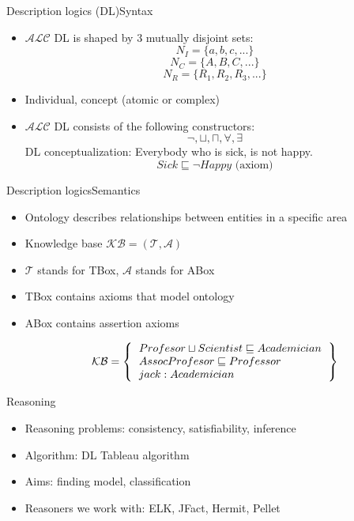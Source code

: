 \documentclass{beamer}
\begin{document}
\begin{frame}{Description logics (DL)}{Syntax}
	\begin{itemize}
	\item {
		$\mathcal{ALC}$ DL is shaped by 3 mutually disjoint sets:
		\[ N_{I} = \{ a,b,c, ... \} \]
		\[ N_{C} = \{ A,B,C, ... \} \]
		\[N_{R} = \{ R_{1}, R_{2}, R_{3}, ... \} \]
	}
	
	\item {
		Individual, concept (atomic or complex)
	}		
	
	\item {
		$\mathcal{ALC}$ DL consists of the following constructors:
		\[ \neg, \sqcup, \sqcap, \forall, \exists \]
		DL conceptualization: Everybody who is sick, is not happy.
		\[ Sick \sqsubseteq \neg Happy \text{ (axiom)} \]
	}
	\end{itemize}
\end{frame}

\begin{frame}{Description logics}{Semantics}
	\begin{itemize}
				
		\item {
			Ontology describes relationships between entities in a specific area
		}
		
		\item {
			Knowledge base $\mathcal{KB} = (\mathcal{T}, \mathcal{A})$	
		}
		
		\item {
			$\mathcal{T}$ stands for TBox, $\mathcal{A}$ stands for ABox
		}
		
		\item {
			TBox contains axioms that model ontology
		}
		
		\item {
			ABox contains assertion axioms
		}
		
		\[ 
		\mathcal{KB} = \left\{
		\begin{tabular}{l c}
		$Profesor \sqcup Scientist \sqsubseteq Academician$ \\
		$AssocProfesor \sqsubseteq Professor$ \\
		$jack: Academician$ \\
		\end{tabular}
		\right \}
		\]

	\end{itemize}
\end{frame}

\begin{frame}{Reasoning}
	\begin{itemize}
		\item {
			Reasoning problems: consistency, satisfiability, inference
		}
		
		\item {
			Algorithm: DL Tableau algorithm
		}
		
		\item {
			Aims: finding model, classification
		}
		
		\item {
			Reasoners we work with: ELK, JFact, Hermit, Pellet
		}
	\end{itemize}
\end{frame}
\end{document}
